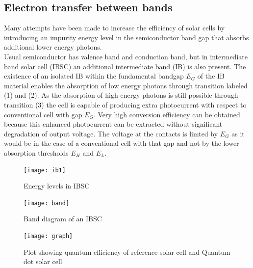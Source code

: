 \documentclass[hidelinks, 12pt]{report}
\begin{document}
\subsection{Electron transfer between bands}
Many attempts have been made to increase the efficiency  of solar cells by introducing an impurity energy level in the semiconductor band gap that absorbs additional lower energy photons. \\
Usual semiconductor has valence band and conduction band, but in intermediate band solar cell (IBSC) an additional intermediate band (IB) is also present. The existence of an isolated IB within the fundamental bandgap \(E_G\) of the IB material enables the absorption of low energy photons through transition labeled (1) and (2). As the absorption of high energy photons is still possible through transition (3) the cell is capable of producing extra photocurrent with respect to conventional cell with gap \(E_G\). Very high conversion efficiency can be obtained because this enhanced photocurrent can be extracted without significant degradation of output voltage. The voltage at the contacts is limted by $E_{G}$ as it would be in the case of a conventional cell with that gap and not by the lower absorption thresholds $E_{H}$ and $E_{L}$. \cite{band}\\

\begin{minipage}[t]{8cm}
\flushleft
\begin{figure}[H]
\texttt{[image: ib1]}
\caption[Energy levels in IBSC]{Energy levels in IBSC \cite{band}}
\label{Energy levels}
\end{figure}
\end{minipage}

\begin{minipage}[t]{8cm}
\begin{figure}[H]
\flushright
\texttt{[image: band]}
\caption[Band diagram of an IBSC]{Band diagram of an IBSC \cite{ib}}
\label{Band Diagram}
\end{figure}
\end{minipage}

\begin{figure}[H]
\centering
\texttt{[image: graph]}
\caption[Plot showing quantum efficiency of reference solar cell and Quantum dot solar cell]{Plot showing quantum efficiency of reference solar cell and Quantum dot solar cell \cite{plot}}
\label{Band Diagram}
\end{figure}
\end{document}
